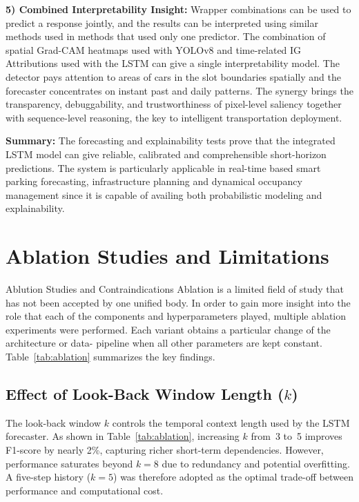 \documentclass[conference]{IEEEtran}
\begin{document}
\vspace{0.3em}
\noindent\textbf{5) Combined Interpretability Insight:}
Wrapper combinations can be used to predict a response jointly, and the results can be interpreted using similar methods used in methods that used only one predictor.
The combination of spatial Grad-CAM heatmaps used with YOLOv8 and time-related IG Attributions used with the LSTM can give a single interpretability model. The detector pays attention to areas of cars in the slot boundaries spatially and the forecaster concentrates on instant past and daily patterns. The synergy brings the transparency, debuggability, and trustworthiness of pixel-level saliency together with sequence-level reasoning, the key to intelligent transportation deployment.

\vspace{0.3em}
\noindent\textbf{Summary:}
The forecasting and explainability tests prove that the integrated LSTM model can give reliable, calibrated and comprehensible short-horizon predictions. The system is particularly applicable in real-time based smart parking forecasting, infrastructure planning and dynamical occupancy management since it is capable of availing both probabilistic modeling and explainability.

\section{Ablation Studies and Limitations}
Ablution Studies and Contraindications Ablation is a limited field of study that has not been accepted by one unified body. In order to gain more insight into the role that each of the components and hyperparameters played, multiple ablation experiments were performed. Each variant obtains a particular change of the architecture or data- pipeline when all other parameters are kept constant. Table~\ref{tab:ablation} summarizes the key findings.

\subsection{Effect of Look-Back Window Length ($k$)}
The look-back window $k$ controls the temporal context length used by the LSTM forecaster. As shown in Table~\ref{tab:ablation}, increasing $k$ from~3 to~5 improves F1-score by nearly 2\%, capturing richer short-term dependencies. However, performance saturates beyond $k=8$ due to redundancy and potential overfitting. A five-step history ($k=5$) was therefore adopted as the optimal trade-off between performance and computational cost.
\end{document}
